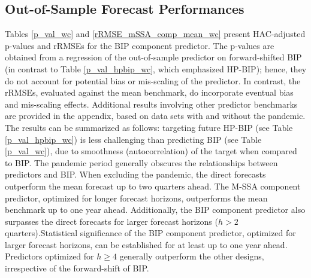 \documentclass[a4paper]{article}
\begin{document}
\subsection{Out-of-Sample Forecast Performances}\label{oosp}



Tables \eqref{p_val_wc} and \eqref{rRMSE_mSSA_comp_mean_wc} present HAC-adjusted p-values and rRMSEs for the BIP component predictor. The p-values are obtained from a regression of the out-of-sample predictor on forward-shifted BIP (in contrast to Table \eqref{p_val_hpbip_wc}, which emphasized HP-BIP); hence, they do not account for potential bias or mis-scaling of the predictor. In contrast, the rRMSEs, evaluated against the mean benchmark, do incorporate eventual bias and mis-scaling effects. Additional results involving other predictor benchmarks are provided in the appendix, based on data sets with and without the pandemic. The results can be summarized as follows: targeting future HP-BIP (see Table \eqref{p_val_hpbip_wc}) is less challenging than predicting BIP (see Table \eqref{p_val_wc}), due to smoothness (autocorrelation) of the target when compared to BIP. The pandemic period generally obscures the relationships between predictors and BIP. When excluding the pandemic, the direct forecasts outperform the mean forecast up to two quarters ahead. The M-SSA component predictor, optimized for longer forecast horizons, outperforms the mean benchmark up to one year ahead. Additionally, the BIP component predictor also surpasses the direct forecasts for larger forecast horizons ($h>2$ quarters).Statistical significance of the BIP component predictor, optimized for larger forecast horizons, can be established for at least up to one year ahead. Predictors optimized for $h\geq 4$ generally outperform the other designs, irrespective of the forward-shift of BIP.  


\end{document}
